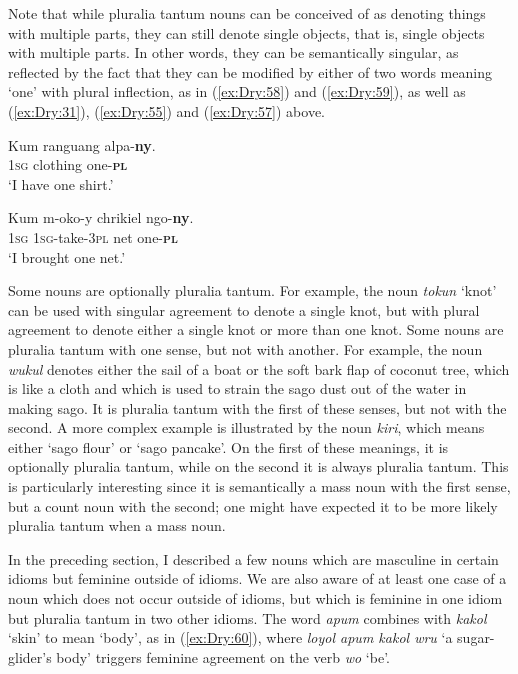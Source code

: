\documentclass[output=collectionpaper]{langsci/langscibook}
\begin{document}
Note that while pluralia tantum nouns can be conceived of as denoting things with multiple parts, they can still denote single objects, that is, single objects with multiple parts. In other words, they can be semantically singular, as reflected by the fact that they can be modified by either of two words meaning `one' with plural inflection, as in (\ref{ex:Dry:58}) and (\ref{ex:Dry:59}), as well as (\ref{ex:Dry:31}), (\ref{ex:Dry:55}) and (\ref{ex:Dry:57}) above.

\ea \label{ex:Dry:58}
\gll Kum	ranguang	alpa-\textbf{ny}.\\
\textsc{1sg} clothing one-\textbf{\textsc{pl}}\\
\glt `I have one shirt.'
\z

\ea \label{ex:Dry:59}
\gll Kum	m-oko-y	chrikiel	ngo-\textbf{ny}.\\
\textsc{1sg} \textsc{1sg}-take-\textsc{3pl} net one-\textbf{\textsc{pl}}\\
\glt `I brought one net.'
\z

Some nouns are optionally pluralia tantum. For example, the noun \textit{tokun} `knot' can be used with singular agreement to denote a single knot, but with plural agreement to denote either a single knot or more than one knot. Some nouns are pluralia tantum with one sense, but not with another. For example, the noun \textit{wukul} denotes either the sail of a boat or the soft bark flap of coconut tree, which is like a cloth and which is used to strain the sago dust out of the water in making sago. It is pluralia tantum with the first of these senses, but not with the second. A more complex example is illustrated by the noun \textit{kiri}, which means either `sago flour' or `sago pancake'. On the first of these meanings, it is optionally pluralia tantum, while on the second it is always pluralia tantum. This is particularly interesting since it is semantically a mass noun with the first sense, but a count noun with the second; one might have expected it to be more likely pluralia tantum when a mass noun.

In the preceding section, I described a few nouns which are masculine in certain idioms but feminine outside of idioms. We are also aware of at least one case of a noun which does not occur outside of idioms, but which is feminine in one idiom but pluralia tantum in two other idioms. The word \textit{apum} combines with \textit{kakol} `skin' to mean `body', as in (\ref{ex:Dry:60}), where \textit{loyol apum kakol wru} `a sugar-glider's body' triggers feminine agreement on the verb \textit{wo} `be'.
\end{document}
